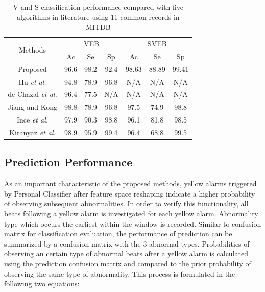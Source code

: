 \begin{table}[tbp]
\centering
\caption{V and S classification performance compared with five algorithms in literature using 11 common records in MITDB}
\label{table:classification_comp}
\begin{tabular}{|c|c|c|c|c|c|c|}
\hline
\multirow{2}{*}{Methods} & \multicolumn{3}{c|}{VEB} & \multicolumn{3}{c|}{SVEB} \\ \cline{2-7} 
                         & Ac     & Se     & Sp     & Ac      & Se     & Sp     \\ \hline
Proposed                 & 96.6   & 98.2   & 92.4   & 98.63   & 88.89  & 99.41  \\ \hline
Hu \textit{et al.}\cite{Hu_et_al}     & 94.8   & 78.9   & 96.8   & N/A     & N/A    & N/A    \\ \hline
de Chazal \textit{et al.}\cite{autofs}  & 96.4   & 77.5   & N/A    & N/A     & N/A    & N/A    \\ \hline
Jiang and Kong \cite{bbnn}    & 98.8   & 78.9   & 96.8   & 97.5    & 74.9   & 98.8   \\ \hline
Ince \textit{et al.} \cite{ince2009generic}    & 97.9   & 90.3   & 98.8   & 96.1    & 81.8   & 98.5   \\ \hline
Kiranyaz \textit{et al.}\cite{Kiranyaz}         & 98.9   & 95.9   & 99.4   & 96.4    & 68.8   & 99.5   \\ \hline
\end{tabular}
\end{table}

\subsection{Prediction Performance}

As an important characteristic of the proposed methods, yellow alarms triggered by Personal Classifier after feature space reshaping indicate a higher probability of observing subsequent abnormalities. In order to verify this functionality, all beats following a yellow alarm is investigated for each yellow alarm. Abnormality type which occurs the earliest within the window is recorded. Similar to confusion matrix for classification evaluation, the performance of prediction can be summarized by a confusion matrix with the 3 abnormal types. Probabilities of observing an certain type of abnormal beats after a yellow alarm is calculated using the prediction confusion matrix and compared to the prior probability of observing the same type of abnormality. This process is formulated in the following two equations:

